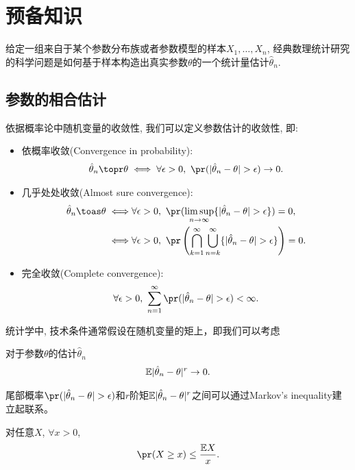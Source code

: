 \section{预备知识}
给定一组来自于某个参数分布族或者参数模型的样本$X_1,\ldots,X_n$, 经典数理统计研究的科学问题是如何基于样本构造出真实参数$\theta$的一个统计量估计$\hat{\theta}_n$.   
\subsection{参数的相合估计}
依据概率论中随机变量的收敛性, 我们可以定义参数估计的收敛性, 即:
\begin{itemize}
	\item 依概率收敛(Convergence in probability):
	\begin{align*}
		\hat{\theta}_n \topr \theta \iff \forall \epsilon>0,~\pr(|\hat{\theta}_n-\theta|>\epsilon)\to 0.
	\end{align*}
	\item 几乎处处收敛(Almost sure convergence):
	\begin{align*}
		\hat{\theta}_n \toas \theta \iff & \forall \epsilon>0,~\pr(\limsup_{n \to \infty}\{|\hat{\theta}_n-\theta|>\epsilon\})=0,\\\iff & \forall \epsilon>0,~\pr\left(\bigcap\limits_{k=1}^\infty \bigcup\limits_{n=k}^\infty \{|\hat{\theta}_n-\theta|>\epsilon\}\right)=0.
	\end{align*}
	\item 完全收敛(Complete convergence):
	\begin{align*}
		\forall \epsilon>0,~\sum_{n=1}^\infty \pr(|\hat{\theta}_n-\theta|>\epsilon)<\infty.
	\end{align*}
\end{itemize}


统计学中, 技术条件通常假设在随机变量的矩上，即我们可以考虑
\begin{defin}[$r$阶矩相合]
对于参数$\theta$的估计$\hat{\theta}_n$
\begin{align*}	
	\mathbb{E}|\hat{\theta}_n-\theta|^r \to 0.
	\end{align*}
\end{defin}
尾部概率$\pr(|\hat{\theta}_n-\theta|>\epsilon)$和$r$阶矩$\mathbb{E}|\hat{\theta}_n-\theta|^r$之间可以通过Markov's inequality建立起联系。
\begin{lem}
	对任意$X$, $\forall x >0$,
	\begin{align*}
		\pr(X \geq x) \leq \frac{\E X}{x}.
	\end{align*}
\end{lem}

